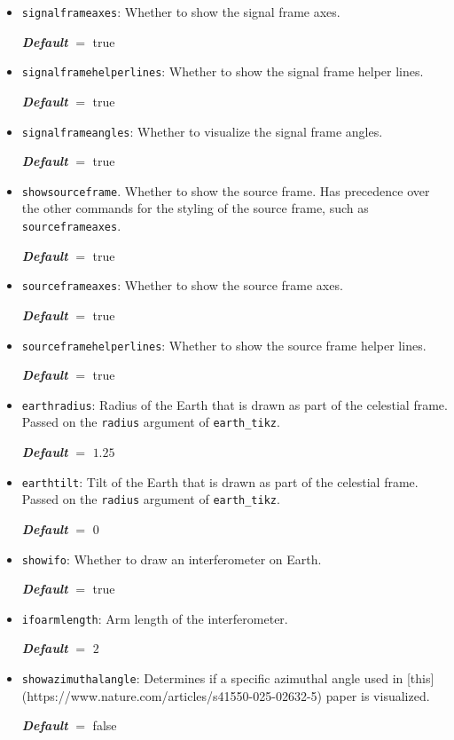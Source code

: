 \documentclass[
    DIV=11,
    BCOR=0mm,
    paper=a4,
    fontsize=11pt,
    twoside=false,
    titlepage=true
]{scrartcl}
\newcommand{\code}[1]{\textcolor{codecolor}{\texttt{#1}}}
\newcommand{\defaultval}[1]{%
    {\bfseries\slshape%
    Default} $=$ #1%
}
\begin{document}
\begin{itemize}
    \defaultval{true}


    \item \code{signalframeaxes}: Whether to show the signal frame axes.

    \defaultval{true}


    \item \code{signalframehelperlines}: Whether to show the signal frame helper lines.

    \defaultval{true}


    \item \code{signalframeangles}: Whether to visualize the signal frame angles.

    \defaultval{true}


    \item \code{showsourceframe}. Whether to show the source frame. Has precedence over the other commands for the styling of the source frame, such as \code{sourceframeaxes}.

    \defaultval{true}


    \item \code{sourceframeaxes}: Whether to show the source frame axes.

    \defaultval{true}


    \item \code{sourceframehelperlines}: Whether to show the source frame helper lines.

    \defaultval{true}


    \item \code{earthradius}: Radius of the Earth that is drawn as part of the celestial frame. Passed on the \code{radius} argument of \code{earth\_tikz}.

    \defaultval{$1.25$}


    \item \code{earthtilt}: Tilt of the Earth that is drawn as part of the celestial frame. Passed on the \code{radius} argument of \code{earth\_tikz}.

    \defaultval{$0$}


    \item \code{showifo}: Whether to draw an interferometer on Earth.

    \defaultval{true}


    \item \code{ifoarmlength}: Arm length of the interferometer.

    \defaultval{$2$}


    \item \code{showazimuthalangle}: Determines if a specific azimuthal angle used in [this](https://www.nature.com/articles/s41550-025-02632-5) paper is visualized.

    \defaultval{false}
\end{itemize}
\end{document}
